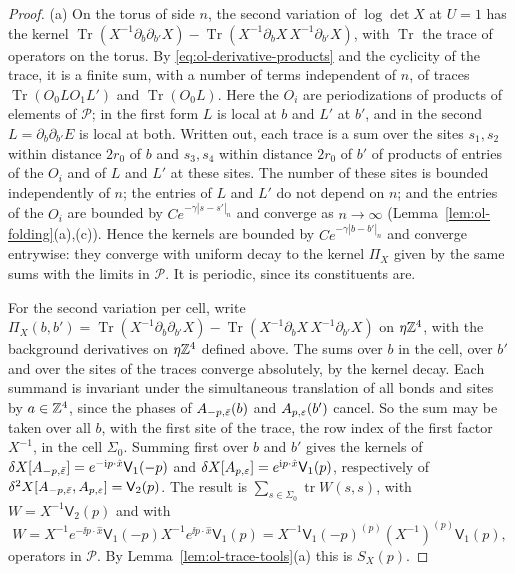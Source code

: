 \begin{proof}
(a) On the torus of side $n$, the second variation of $\log\det X$ at $U=1$ has the kernel $\operatorname{Tr}(X^{-1}\partial_b\partial_{b'}X)-\operatorname{Tr}(X^{-1}\partial_bX\,X^{-1}\partial_{b'}X)$, with $\operatorname{Tr}$ the trace of operators on the torus. By \eqref{eq:ol-derivative-products} and the cyclicity of the trace, it is a finite sum, with a number of terms independent of $n$, of traces $\operatorname{Tr}(O_0LO_1L')$ and $\operatorname{Tr}(O_0L)$. Here the $O_i$ are periodizations of products of elements of $\mathscr P$; in the first form $L$ is local at $b$ and $L'$ at $b'$, and in the second $L=\partial_b\partial_{b'}E$ is local at both. Written out, each trace is a sum over the sites $s_1,s_2$ within distance $2r_0$ of $b$ and $s_3,s_4$ within distance $2r_0$ of $b'$ of products of entries of the $O_i$ and of $L$ and $L'$ at these sites. The number of these sites is bounded independently of $n$; the entries of $L$ and $L'$ do not depend on $n$; and the entries of the $O_i$ are bounded by $Ce^{-\gamma|s-s'|_n}$ and converge as $n\to\infty$ (Lemma~\ref{lem:ol-folding}(a),(c)). Hence the kernels are bounded by $Ce^{-\gamma|b-b'|_n}$ and converge entrywise: they converge with uniform decay to the kernel $\Pi_X$ given by the same sums with the limits in $\mathscr P$. It is periodic, since its constituents are.

For the second variation per cell, write $\Pi_X(b,b')=\operatorname{Tr}(X^{-1}\partial_b\partial_{b'}X)-\operatorname{Tr}(X^{-1}\partial_bX\,X^{-1}\partial_{b'}X)$ on $\eta\mathbb Z^4$, with the background derivatives on $\eta\mathbb Z^4$ defined above. The sums over $b$ in the cell, over $b'$ and over the sites of the traces converge absolutely, by the kernel decay. Each summand is invariant under the simultaneous translation of all bonds and sites by $a\in\mathbb Z^4$, since the phases of $A_{-p,\bar{\varepsilon}}(b)$ and $A_{p,\varepsilon}(b')$ cancel. So the sum may be taken over all $b$, with the first site of the trace, the row index of the first factor $X^{-1}$, in the cell $\Sigma_0$. Summing first over $b$ and $b'$ gives the kernels of $\delta X[A_{-p,\bar{\varepsilon}}]=e^{-\mathrm i p\cdot\hat x}\mathsf V_1(-p)$ and $\delta X[A_{p,\varepsilon}]=e^{\mathrm i p\cdot\hat x}\mathsf V_1(p)$, respectively of $\delta^2X[A_{-p,\bar{\varepsilon}},A_{p,\varepsilon}]=\mathsf V_2(p)$. The result is $\sum_{s\in\Sigma_0}\operatorname{tr}W(s,s)$, with $W=X^{-1}\mathsf V_2(p)$ and with
\[
W=X^{-1}e^{-\ii p\cdot\hat x}\mathsf V_1(-p)X^{-1}e^{\ii p\cdot\hat x}\mathsf V_1(p)=X^{-1}\mathsf V_1(-p)^{(p)}(X^{-1})^{(p)}\mathsf V_1(p),
\]
operators in $\mathscr P$. By Lemma~\ref{lem:ol-trace-tools}(a) this is $S_X(p)$.


\end{proof}
